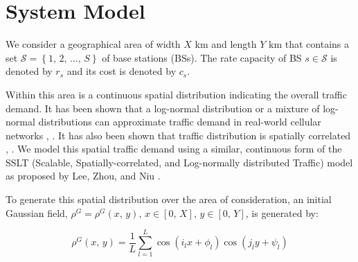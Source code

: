 \documentclass[onecolumn,draftcls]{IEEEtran}
\begin{document}


\section{System Model} \label{model}
We consider a geographical area of width $X$ km and length $Y$ km that contains a set $\mathcal{S} = \left\{1,\, 2,\, \ldots,\, S\right\}$ of base stations (BSs).  The rate capacity of BS $s \in \mathcal{S}$ is denoted by $r_s$ and its cost is denoted by $c_s$.

Within this area is a continuous spatial distribution indicating the overall traffic demand.  It has been shown that a log-normal distribution or a mixture of log-normal distributions can approximate traffic demand in real-world cellular networks \cite{686105}, \cite{5936263}.  It has also been shown that traffic distribution is spatially correlated \cite{5936263}, \cite{eigenplaces}.  We model this spatial traffic demand using a similar, continuous form of the SSLT (Scalable, Spatially-correlated, and Log-normally distributed Traffic) model as proposed by Lee, Zhou, and Niu \cite{6554749}.

To generate this spatial distribution over the area of consideration, an initial Gaussian field, $\rho^G = \rho^G\left(x,\, y\right),\, x \in \left[0,\, X\right],\, y \in \left[0,\, Y\right]$, is generated by:

\begin{equation}
\rho^G\left(x,\, y\right)=\frac{1}{L}\sum_{l=1}^L \cos\left(i_lx+\phi_l\right) \cos\left(j_ly+\psi_l\right)
\end{equation}
\end{document}
